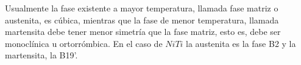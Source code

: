 \documentclass[11pt]{beamer}
\begin{document}
		\begin{frame}
			Usualmente la fase existente a mayor temperatura, llamada fase matriz o austenita, es cúbica, mientras que la fase de menor temperatura, llamada martensita debe tener menor simetría que la fase matriz, esto es, debe ser monoclínica u ortorrómbica. En el caso de $NiTi$ la austenita es la fase B2 y la martensita, la B19'.
			\begin{figure}[H]
			\end{figure}
		\end{frame}
\end{document}
